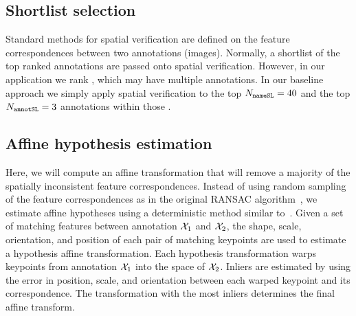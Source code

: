 
    \subsection{Shortlist selection}
        Standard methods for spatial verification are defined on the feature correspondences between two
        annotations (images). Normally, a shortlist of the top ranked annotations are passed onto spatial
        verification. However, in our application we rank \names{}, which may have multiple annotations. In our
        baseline approach we simply apply spatial verification to the top $N_{\tt{nameSL}}=40$ \names{} and the top
        $N_{\tt{annotSL}}=3$ annotations within those \names{}.

    \subsection{Affine hypothesis estimation}
        Here, we will compute an affine transformation that will remove a majority of the spatially inconsistent
        feature correspondences. Instead of using random sampling of the feature correspondences as in the original
        RANSAC algorithm~\cite{hartley_multiple_2003}, we estimate affine hypotheses using a deterministic method
        similar to~\cite{philbin_object_2007, chum_homography_2012}. Given a set of matching features between
        annotation $\mathcal{X}_{1}$ and $\mathcal{X}_{2}$, the shape, scale, orientation, and position of each pair of matching
        keypoints are used to estimate a hypothesis affine transformation. Each hypothesis transformation warps
        keypoints from annotation $\mathcal{X}_{1}$ into the space of $\mathcal{X}_{2}$. Inliers are estimated by using the error
        in position, scale, and orientation between each warped keypoint and its correspondence. The transformation
        with the most inliers determines the final affine transform.

        \newcommand{\AffMat}{\mat{A}}
        \newcommand{\HypothSet}{\set{A}}
        \newcommand{\AffMatij}{\mat{A}_{i, j}}
        \newcommand{\HypothAffMat}{\hat{\mat{A}}}

